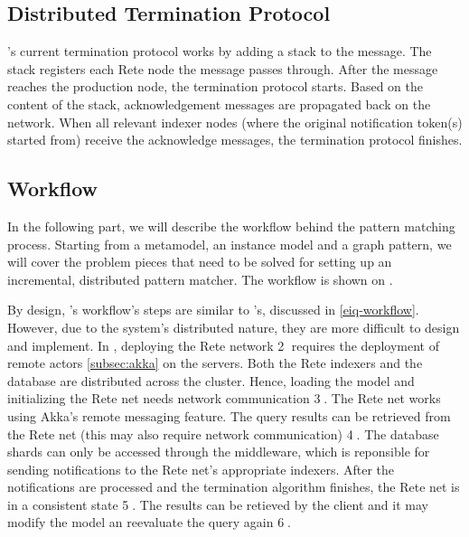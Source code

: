 
\subsection{Distributed Termination Protocol}

\iqd{}'s current termination protocol works by adding a stack to the message. The stack registers each Rete node the message passes through. After the message reaches the production node, the termination protocol starts. Based on the content of the stack, acknowledgement messages are propagated back on the network. When all relevant indexer nodes (where the original notification token(s) started from) receive the acknowledge messages, the termination protocol finishes.

\subsection{Workflow}
\label{iqd-workflow}

In the following part, we will describe the workflow behind the pattern matching process. Starting from a metamodel, an instance model and a graph pattern, we will cover the problem pieces that need to be solved for setting up an incremental, distributed pattern matcher. The workflow is shown on .
 

By design, \iqd{}'s workflow's steps are similar to \eiq{}'s, discussed in \autoref{eiq-workflow}. However, due to the system's distributed nature, they are more difficult to design and implement.
In \iqd{}, deploying the Rete network \textcircled{2} requires the deployment of remote actors \autoref{subsec:akka} on the servers. Both the Rete indexers and the database are distributed across the cluster. Hence, loading the model and initializing the Rete net needs network communication \textcircled{3}. The Rete net works using Akka's remote messaging feature. The query results can be retrieved from the Rete net (this may also require network communication) \textcircled{4}. The database shards can only be accessed through the middleware, which is reponsible for sending notifications to the Rete net's appropriate indexers. After the notifications are processed and the termination algorithm finishes, the Rete net is in a consistent state \textcircled{5}. The results can be retieved by the client and it may modify the model an reevaluate the query again \textcircled{6}. 

